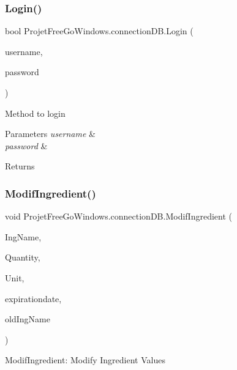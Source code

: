 \subsubsection{\texorpdfstring{Login()}{Login()}}
{\footnotesize\ttfamily bool Projet\+Free\+Go\+Windows.\+connection\+D\+B.\+Login (\begin{DoxyParamCaption}\item[{string}]{username,  }\item[{string}]{password }\end{DoxyParamCaption})}



Method to login 


\begin{DoxyParams}{Parameters}
{\em username} & \\
\hline
{\em password} & \\
\hline
\end{DoxyParams}
\begin{DoxyReturn}{Returns}

\end{DoxyReturn}
\mbox{\label{class_projet_free_go_windows_1_1connection_d_b_ae604e65630f4bd5efa4bfc3782b9e596}} 
\subsubsection{\texorpdfstring{Modif\+Ingredient()}{ModifIngredient()}}
{\footnotesize\ttfamily void Projet\+Free\+Go\+Windows.\+connection\+D\+B.\+Modif\+Ingredient (\begin{DoxyParamCaption}\item[{string}]{Ing\+Name,  }\item[{int}]{Quantity,  }\item[{int}]{Unit,  }\item[{Date\+Time}]{expirationdate,  }\item[{string}]{old\+Ing\+Name }\end{DoxyParamCaption})}



Modif\+Ingredient\+: Modify Ingredient Values 


